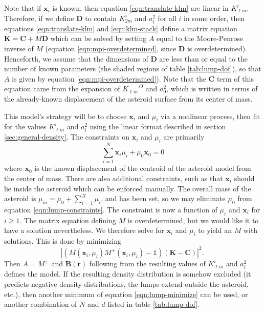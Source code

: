 \documentclass[fleqn,usenatbib]{mnras}
\begin{document}
Note that if $\bm x_i$ is known, then equation \ref{eqn:translate-klm} are linear in $K_{\ell m}^i$. Therefore, if we define $\bm D$ to contain $K_{2m}^i$ and $a_i^2$ for all $i$ in some order, then equations \ref{eqn:translate-klm} and \ref{eqn:klm-stack} define a matrix equation $\bm K = \bm C + M \bm D$ which can be solved by setting $A$ equal to the Moore-Penrose inverse of $M$ (equation \ref{eqn:mpi-overdetermined}, since $\bm D$ is overdetermined). Henceforth, we assume that the dimensions of $\bm D$ are less than or equal to the number of known parameters (the shaded regions of table \ref{tab:lump-dof}), so that $A$ is given by equation \ref{eqn:mpi-overdetermined}). Note that the $\bm C$ term of this equation came from the expansion of $K_{\ell m}'^0$ and $a_0^2$, which is written in terms of the already-known displacement of the asteroid surface from its center of mass.

This model's strategy will be to choose $\bm x_i$ and $\mu_i$ via a nonlinear process, then fit for the values $K_{\ell m}^i$ and $a_i^2$ using the linear format described in section \ref{sec:general-density}. The constraints on $\bm x_i$ and $\mu_i$ are primarily
\begin{equation}
  \sum_{i=1}^N \bm x_i \mu_i + \mu_0 \bm x_0 = 0
  \label{eqn:lump-constraints}
\end{equation}
where $\bm x_0$ is the known displacement of the centroid of the asteroid model from the center of mass. There are also additional constraints, such as that $\bm x_i$ should lie inside the asteroid which can be enforced manually. The overall mass of the asteroid is $\mu_m = \mu_0 + \sum_{i=1}^N \mu_i$, and has been set, so we may eliminate $\mu_0$ from equation \ref{eqn:lump-constraints}. The constraint is now a function of $\mu_i$ and $\bm x_i$ for $i \geq 1$. The matrix equation defining $M$ is overdetermined, but we would like it to have a solution nevertheless. We therefore solve for $\bm x_i$ and $\mu_i$ to yield an $M$ with solutions. This is done by minimizing
\begin{equation}
  |(M(\bm x_i, \mu_i) M^+(\bm x_i, \mu_i) - \mathds{1}) (\bm K - \bm C)|^2.\
  \label{eqn:lump-minimize}
\end{equation}
Then $A=M^+$ and $\bm B(\bm r)$ following from the resulting values of $K_{\ell m}^i$ and $a_i^2$ defines the model. If the resulting density distribution is somehow excluded (it predicts negative density distributions, the lumps extend outside the asteroid, etc.), then another minimum of equation \ref{eqn:lump-minimize} can be used, or another combination of $N$ and $d$ listed in table \ref{tab:lump-dof}.
\end{document}
